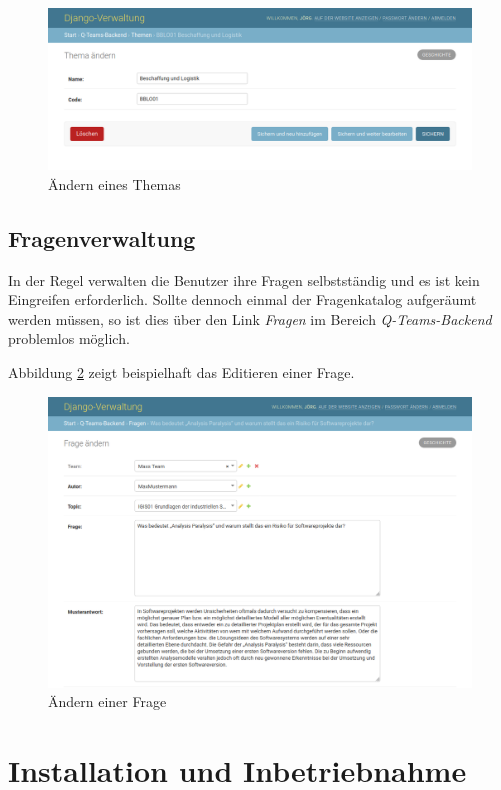 \documentclass[a4paper,11pt,listof=numbered,glossary=totoc,parskip=half,toc=bib]{scrreprt}
\begin{document}
\begin{appendices}
	\begin{figure}
		\centering
		\includegraphics[width=\textwidth]{editthema}
		\caption{Ändern eines Themas}
		\label{fig:editthema}
	\end{figure}
	
	\section{Fragenverwaltung}
	In der Regel verwalten die Benutzer ihre Fragen selbstständig und es ist kein Eingreifen erforderlich. Sollte dennoch einmal der Fragenkatalog aufgeräumt werden müssen, so ist dies über den Link \textit{Fragen} im Bereich \textit{Q-Teams-Backend} problemlos möglich. 
	
	Abbildung \ref{fig:editfrage} zeigt beispielhaft das Editieren einer Frage.
	
	\begin{figure}
		\centering
		\includegraphics[width=\textwidth]{editfrage}
		\caption{Ändern einer Frage}
		\label{fig:editfrage}
	\end{figure}
	
	\chapter{Installation und Inbetriebnahme}
	

\end{appendices}
\end{document}
